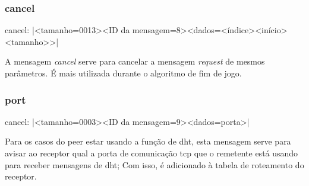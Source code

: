 
\newpage
\subsubsection*{cancel}

cancel: \bverb|<tamanho=0013><ID da mensagem=8><dados=<índice><início><tamanho>>|

A mensagem \emph{cancel} serve para cancelar a mensagem \emph{request} de mesmos
parâmetros. É mais utilizada durante o algoritmo de fim de jogo.


\subsubsection*{port}

cancel: \bverb|<tamanho=0003><ID da mensagem=9><dados=porta>|

Para os casos do \gls*{peer} estar usando a função de \gls*{dht}, esta mensagem serve
para avisar ao receptor qual a porta de comunicação \gls*{tcp} que o remetente está
usando para receber mensagens de \gls*{dht}; Com isso, é adicionado à tabela de
roteamento do receptor.

